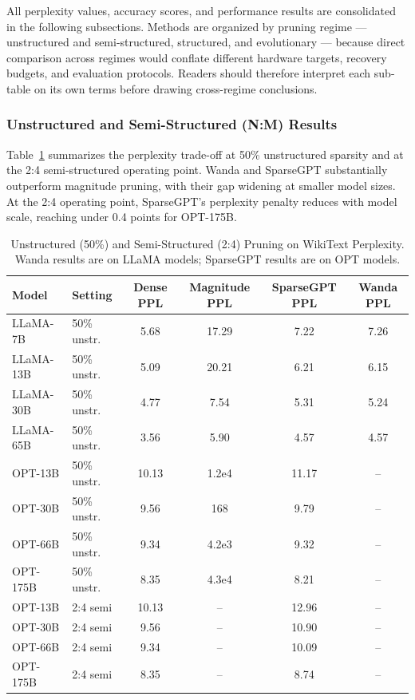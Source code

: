 All perplexity values, accuracy scores, and performance results are consolidated in the following subsections. Methods are organized by pruning regime — unstructured and semi-structured, structured, and evolutionary — because direct comparison across regimes would conflate different hardware targets, recovery budgets, and evaluation protocols. Readers should therefore interpret each sub-table on its own terms before drawing cross-regime conclusions.

\subsubsection{Unstructured and Semi-Structured (N:M) Results}

Table~\ref{tab:unsupported_comparison} summarizes the perplexity trade-off at 50\% unstructured sparsity and at the 2:4 semi-structured operating point. Wanda and SparseGPT substantially outperform magnitude pruning, with their gap widening at smaller model sizes. At the 2:4 operating point, SparseGPT's perplexity penalty reduces with model scale, reaching under 0.4 points for OPT-175B.

\begin{table}[H]
	\centering
	\caption{Unstructured (50\%) and Semi-Structured (2:4) Pruning on WikiText Perplexity. Wanda results are on LLaMA models; SparseGPT results are on OPT models.}
	\label{tab:unsupported_comparison}
	\begin{tabular}{@{}llcccc@{}}
		\toprule
		\textbf{Model} & \textbf{Setting} & \textbf{Dense PPL} & \textbf{Magnitude PPL} & \textbf{SparseGPT PPL} & \textbf{Wanda PPL} \\
		\midrule
		LLaMA-7B  & 50\% unstr. & 5.68 & 17.29 & 7.22 & 7.26 \\
		LLaMA-13B & 50\% unstr. & 5.09 & 20.21 & 6.21 & 6.15 \\
		LLaMA-30B & 50\% unstr. & 4.77 & 7.54  & 5.31 & 5.24 \\
		LLaMA-65B & 50\% unstr. & 3.56 & 5.90  & 4.57 & 4.57 \\
		\midrule
		OPT-13B   & 50\% unstr. & 10.13 & 1.2e4 & 11.17 & -- \\
		OPT-30B   & 50\% unstr. & 9.56  & 168   & 9.79  & -- \\
		OPT-66B   & 50\% unstr. & 9.34  & 4.2e3 & 9.32  & -- \\
		OPT-175B  & 50\% unstr. & 8.35  & 4.3e4 & 8.21  & -- \\
		\midrule
		OPT-13B   & 2:4 semi    & 10.13 & --    & 12.96 & -- \\
		OPT-30B   & 2:4 semi    & 9.56  & --    & 10.90 & -- \\
		OPT-66B   & 2:4 semi    & 9.34  & --    & 10.09 & -- \\
		OPT-175B  & 2:4 semi    & 8.35  & --    & 8.74  & -- \\
		\bottomrule
	\end{tabular}
\end{table}

